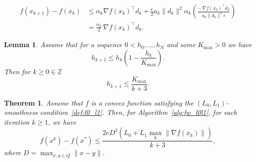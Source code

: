 \documentclass[10pt,a4paper]{amsart}
\newtheorem{lemma}{Lemma}
\newtheorem{theorem}{Theorem}
\begin{document}
		\begin{equation}\label{descent_ineq_alg_2}
			\begin{split}
				f(x_{k+1})-f(x_{k})
				&\le \alpha_{k}\nabla f(x_{k})^{\top}d_{k}
				+\frac{e}{2}a_{k}\|d_{k}\|^{2}\alpha_{k}
				\left(\frac{-\,\nabla f(x_{k})^{\top}d_{k}}
				{a_{k}\|d_{k}\|^{2}e}\right)\\
				&=\frac{\alpha_{k}}{2}\,\nabla f(x_{k})^{\top}d_{k}.
			\end{split}
		\end{equation}

	\begin{lemma}\label{lemma:subopt_rate}
		Assume that for a sequence $0 < h_0, \ldots, h_N$ and some $K_{\text{max}} > 0$ we have
		\begin{equation*}
			h_{k+1} \leq h_k \left( 1 - \frac{h_k}{K_{\text{max}}} \right).
		\end{equation*}
		Then for $k \geq 0 \in \mathbb{Z}$
		\begin{equation*}
			h_{k+1} \leq \frac{K_{\text{max}}}{k + 3}.
		\end{equation*}
	\end{lemma}

	\begin{theorem}\label{th:sublinear_conv_rate2}
		Assume that $f$ is a convex function satisfying the $(L_0,L_1)$-smoothness condition~\ref{def:l0_l1}. Then, for Algorithm~\ref{alg:fw_l0l1}, for each iteration $k \geq 1$, we have
		\begin{equation*}
			f(x^k) - f(x^*) \leq \frac{2eD^2 \left( L_0 + L_1 \max_k \| \nabla f(x_k) \| \right)}{k + 3},
		\end{equation*}
		where $D = \max_{x,y \in Q} \|x - y\|$.
	\end{theorem}
\end{document}
